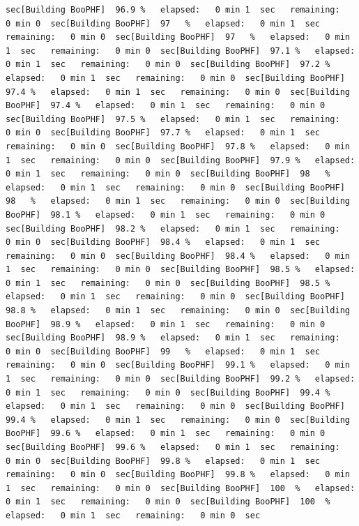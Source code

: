 \documentclass[
]{book}
\begin{document}
\begin{verbatim}
sec[Building BooPHF]  96.9 %   elapsed:   0 min 1  sec   remaining:   0 min 0  sec[Building BooPHF]  97   %   elapsed:   0 min 1  sec   remaining:   0 min 0  sec[Building BooPHF]  97   %   elapsed:   0 min 1  sec   remaining:   0 min 0  sec[Building BooPHF]  97.1 %   elapsed:   0 min 1  sec   remaining:   0 min 0  sec[Building BooPHF]  97.2 %   elapsed:   0 min 1  sec   remaining:   0 min 0  sec[Building BooPHF]  97.4 %   elapsed:   0 min 1  sec   remaining:   0 min 0  sec[Building BooPHF]  97.4 %   elapsed:   0 min 1  sec   remaining:   0 min 0  sec[Building BooPHF]  97.5 %   elapsed:   0 min 1  sec   remaining:   0 min 0  sec[Building BooPHF]  97.7 %   elapsed:   0 min 1  sec   remaining:   0 min 0  sec[Building BooPHF]  97.8 %   elapsed:   0 min 1  sec   remaining:   0 min 0  sec[Building BooPHF]  97.9 %   elapsed:   0 min 1  sec   remaining:   0 min 0  sec[Building BooPHF]  98   %   elapsed:   0 min 1  sec   remaining:   0 min 0  sec[Building BooPHF]  98   %   elapsed:   0 min 1  sec   remaining:   0 min 0  sec[Building BooPHF]  98.1 %   elapsed:   0 min 1  sec   remaining:   0 min 0  sec[Building BooPHF]  98.2 %   elapsed:   0 min 1  sec   remaining:   0 min 0  sec[Building BooPHF]  98.4 %   elapsed:   0 min 1  sec   remaining:   0 min 0  sec[Building BooPHF]  98.4 %   elapsed:   0 min 1  sec   remaining:   0 min 0  sec[Building BooPHF]  98.5 %   elapsed:   0 min 1  sec   remaining:   0 min 0  sec[Building BooPHF]  98.5 %   elapsed:   0 min 1  sec   remaining:   0 min 0  sec[Building BooPHF]  98.8 %   elapsed:   0 min 1  sec   remaining:   0 min 0  sec[Building BooPHF]  98.9 %   elapsed:   0 min 1  sec   remaining:   0 min 0  sec[Building BooPHF]  98.9 %   elapsed:   0 min 1  sec   remaining:   0 min 0  sec[Building BooPHF]  99   %   elapsed:   0 min 1  sec   remaining:   0 min 0  sec[Building BooPHF]  99.1 %   elapsed:   0 min 1  sec   remaining:   0 min 0  sec[Building BooPHF]  99.2 %   elapsed:   0 min 1  sec   remaining:   0 min 0  sec[Building BooPHF]  99.4 %   elapsed:   0 min 1  sec   remaining:   0 min 0  sec[Building BooPHF]  99.4 %   elapsed:   0 min 1  sec   remaining:   0 min 0  sec[Building BooPHF]  99.6 %   elapsed:   0 min 1  sec   remaining:   0 min 0  sec[Building BooPHF]  99.6 %   elapsed:   0 min 1  sec   remaining:   0 min 0  sec[Building BooPHF]  99.8 %   elapsed:   0 min 1  sec   remaining:   0 min 0  sec[Building BooPHF]  99.8 %   elapsed:   0 min 1  sec   remaining:   0 min 0  sec[Building BooPHF]  100  %   elapsed:   0 min 1  sec   remaining:   0 min 0  sec[Building BooPHF]  100  %   elapsed:   0 min 1  sec   remaining:   0 min 0  sec

\end{verbatim}
\end{document}
